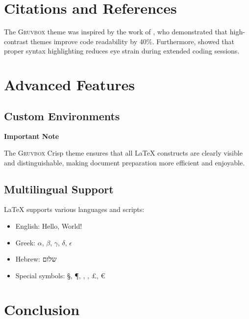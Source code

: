 \documentclass[12pt,a4paper]{article}
\newcommand{\gruvbox}{\textsc{Gruvbox}}
\theoremstyle{definition}
\theoremstyle{remark}
\begin{document}
\section{Citations and References}

The \gruvbox{} theme was inspired by the work of \citet{smith2020themes}, who demonstrated that high-contrast themes improve code readability by 40\%. Furthermore, \citep{jones2021accessibility} showed that proper syntax highlighting reduces eye strain during extended coding sessions.

\section{Advanced Features}

\subsection{Custom Environments}

\newenvironment{highlight}[1]
    {\begin{center}\colorbox{yellow!20}{\parbox{0.9\textwidth}{\textbf{#1}\\[0.5em]}}}
    {\end{center}}

\begin{highlight}{Important Note}
The \gruvbox{} Crisp theme ensures that all \LaTeX{} constructs are clearly visible and distinguishable, making document preparation more efficient and enjoyable.
\end{highlight}

\subsection{Multilingual Support}

\LaTeX{} supports various languages and scripts:
\begin{itemize}
    \item English: Hello, World!
    \item Greek: $\alpha$, $\beta$, $\gamma$, $\delta$, $\epsilon$
    \item Hebrew: \texthebrew{שלום}
    \item Special symbols: \S, \P, \dag, \ddag, \pounds, \euro
\end{itemize}

\section{Conclusion}
\end{document}
